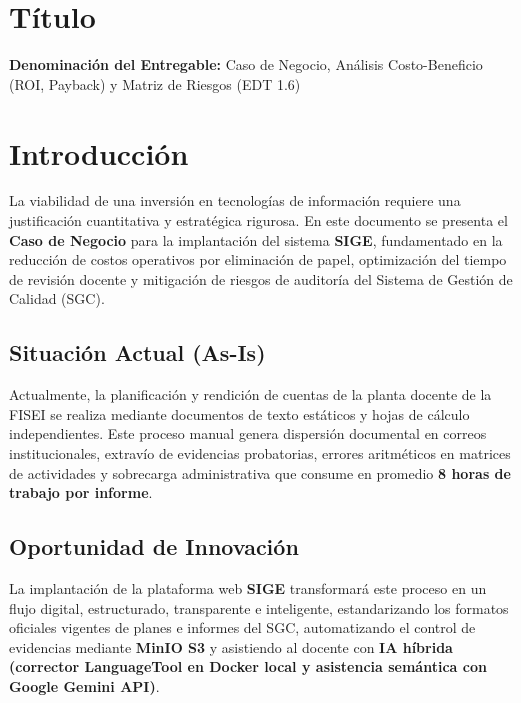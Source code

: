 \documentclass[12pt,a4paper]{article}
\begin{document}

\vspace{0.25cm}
\section{Título}
\textbf{Denominación del Entregable:} Caso de Negocio, Análisis Costo-Beneficio (ROI, Payback) y Matriz de Riesgos (EDT 1.6)



\section{Introducción}
La viabilidad de una inversión en tecnologías de información requiere una justificación cuantitativa y estratégica rigurosa. En este documento se presenta el \textbf{Caso de Negocio} para la implantación del sistema \textbf{SIGE}, fundamentado en la reducción de costos operativos por eliminación de papel, optimización del tiempo de revisión docente y mitigación de riesgos de auditoría del Sistema de Gestión de Calidad (SGC).

\subsection{Situación Actual (As-Is)}
Actualmente, la planificación y rendición de cuentas de la planta docente de la FISEI se realiza mediante documentos de texto estáticos y hojas de cálculo independientes. Este proceso manual genera dispersión documental en correos institucionales, extravío de evidencias probatorias, errores aritméticos en matrices de actividades y sobrecarga administrativa que consume en promedio \textbf{8 horas de trabajo por informe}.

\subsection{Oportunidad de Innovación}
La implantación de la plataforma web \textbf{SIGE} transformará este proceso en un flujo digital, estructurado, transparente e inteligente, estandarizando los formatos oficiales vigentes de planes e informes del SGC, automatizando el control de evidencias mediante \textbf{MinIO S3} y asistiendo al docente con \textbf{IA híbrida (corrector LanguageTool en Docker local y asistencia semántica con Google Gemini API)}.
\end{document}
